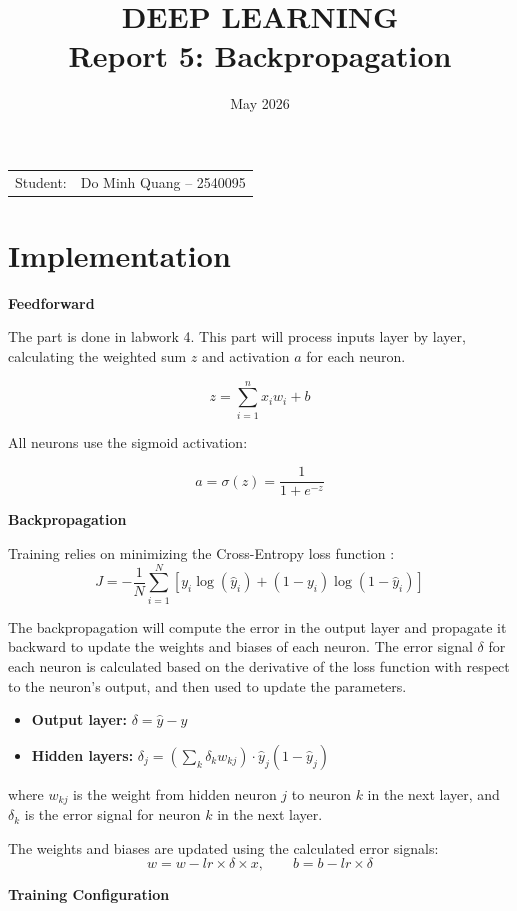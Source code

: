 \documentclass{article}
\title{\textbf{DEEP LEARNING} \\
{\Large \textbf{Report 5: Backpropagation}}}
\date{May 2026}
\begin{document}
\pagestyle{plain}
\maketitle

\noindent\begin{tabular}{@{}ll}
  Student: & Do Minh Quang -- 2540095 \\
\end{tabular}

\section*{Implementation}

\textbf{Feedforward}

The part is done in labwork 4. This part will process inputs layer by layer, calculating the weighted sum \(z\) and activation \(a\) for each neuron.

\[
z = \sum_{i=1}^{n} x_iw_i + b
\]

All neurons use the sigmoid activation:

\[
a = \sigma(z) = \frac{1}{1 + e^{-z}}
\]


\textbf{Backpropagation}

Training relies on minimizing the Cross-Entropy loss function :
\[
J = -\frac{1}{N}\sum_{i=1}^N \left[ y_i \log(\hat{y}_i) + (1 - y_i)\log(1 - \hat{y}_i) \right]
\]

The backpropagation will compute the error in the output layer and propagate it backward to update the weights and biases of each neuron. 
The error signal \(\delta\) for each neuron is calculated based on the derivative of the loss function with respect to the neuron's output, and then used to update the parameters.
\begin{itemize}
    \item \textbf{Output layer:} $\delta = \hat{y} - y$
    \item \textbf{Hidden layers:} $\delta_j = \left(\sum_k \delta_k w_{kj}\right)\cdot \hat{y}_j(1-\hat{y}_j)$
\end{itemize}
where $w_{kj}$ is the weight from hidden neuron $j$ to neuron $k$ in the next layer, and $\delta_k$ is the error signal for neuron $k$ in the next layer.

The weights and biases are updated using the calculated error signals:
\[
    w = w - lr \times \delta \times x, \qquad b = b - lr \times \delta
\]

\textbf{Training Configuration}
\end{document}
